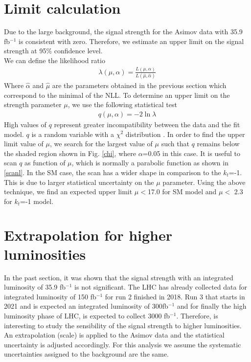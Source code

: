 	\pagebreak
	\section{Limit calculation}
	Due to the large background, the signal strength for the Asimov data with 35.9 fb$^{-1}$ is consistent with zero.
	Therefore, we estimate an upper limit on the signal strength at 95$\%$ confidence level.\\
	
	We can define the likelihood ratio
	\begin{align}
		\lambda(\mu,\alpha)=\frac{L(\mu,\alpha)}{L(\hat{\mu},\hat{\alpha})}
	\end{align}
	Where $\hat{\alpha}$ and $\hat{\mu}$ are the parameters obtained in the previous section which correspond to the minimal of the NLL.
	To determine an upper limit on the strength parameter $\mu$, we use the following statistical test
	\begin{align}
		q(\mu,\alpha)= -2\ln{\lambda} 
	\end{align}
	High values of $q$ represent greater incompatibility between the data and the fit model.
	$q$ is a random variable with a $\chi^2$ distribution \cite{asimov}.
	In order to find the upper limit value of $\mu$, we search for the largest value of $\mu$ such that $q$ remains below the shaded region shown in Fig. \ref{chi}, where $\alpha$=0.05 in this case. 
	It is useful to scan $q$ as function of $\mu$, which is normally a parabolic function as shown in \ref{scanl}. In the SM case, the scan has a wider shape in comparison to the $k_t$=-1. This is due to larger statistical uncertainty on the $\mu$ parameter. 
	Using the above technique, we find an expected upper limit $\mu < $17.0 for SM model and $\mu < $ 2.3 for $k_t$=-1 model. 
	
	
	
	
	\section{Extrapolation for higher luminosities}
	In the past section, it was shown that the signal strength with an integrated luminosity of 35.9 fb$^{-1}$ is not significant. The LHC has already collected data for integrated luminosity of 150 fb$^{-1}$ for run 2 finished in 2018. Run 3 that starts in 2021 and is expected an integrated luminosity of 300fb$^{-1}$ and for finally the high luminosity phase of LHC, is expected to collect 3000 fb$^{-1}$. Therefore, is interesting to study the sensibility of the signal strength to higher luminosities. 
	An extrapolation (scale) is applied to the Asimov data and the statistical uncertainty is adjusted accordingly. For this analysis we assume the systematic uncertainties assigned to the background are the same.
	\\
	
